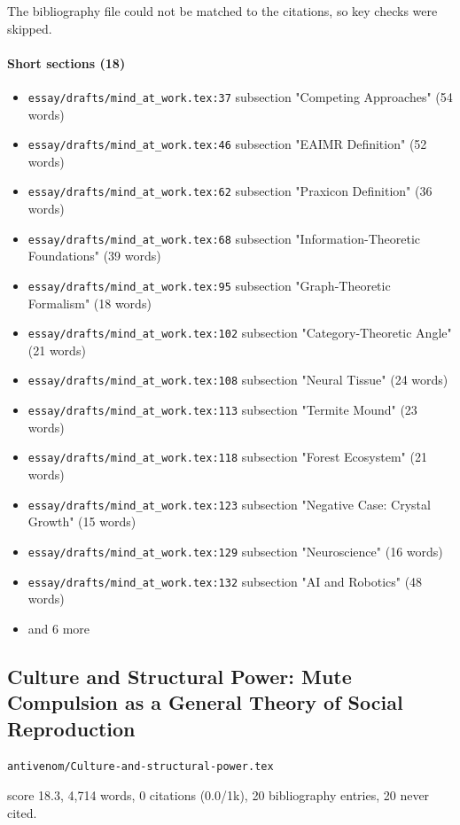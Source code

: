 \documentclass[11pt]{article}
\newcommand{\loc}[1]{{\small\color{muted}\texttt{#1}}}
\begin{document}
The bibliography file could not be matched to the citations, so key checks were skipped.

\paragraph{Short sections (18)}
\begin{itemize}
\item \loc{essay/\allowbreak{}drafts/\allowbreak{}mind\_at\_work.tex:37} subsection "Competing Approaches" (54 words)
\item \loc{essay/\allowbreak{}drafts/\allowbreak{}mind\_at\_work.tex:46} subsection "EAIMR Definition" (52 words)
\item \loc{essay/\allowbreak{}drafts/\allowbreak{}mind\_at\_work.tex:62} subsection "Praxicon Definition" (36 words)
\item \loc{essay/\allowbreak{}drafts/\allowbreak{}mind\_at\_work.tex:68} subsection "Information-Theoretic Foundations" (39 words)
\item \loc{essay/\allowbreak{}drafts/\allowbreak{}mind\_at\_work.tex:95} subsection "Graph-Theoretic Formalism" (18 words)
\item \loc{essay/\allowbreak{}drafts/\allowbreak{}mind\_at\_work.tex:102} subsection "Category-Theoretic Angle" (21 words)
\item \loc{essay/\allowbreak{}drafts/\allowbreak{}mind\_at\_work.tex:108} subsection "Neural Tissue" (24 words)
\item \loc{essay/\allowbreak{}drafts/\allowbreak{}mind\_at\_work.tex:113} subsection "Termite Mound" (23 words)
\item \loc{essay/\allowbreak{}drafts/\allowbreak{}mind\_at\_work.tex:118} subsection "Forest Ecosystem" (21 words)
\item \loc{essay/\allowbreak{}drafts/\allowbreak{}mind\_at\_work.tex:123} subsection "Negative Case: Crystal Growth" (15 words)
\item \loc{essay/\allowbreak{}drafts/\allowbreak{}mind\_at\_work.tex:129} subsection "Neuroscience" (16 words)
\item \loc{essay/\allowbreak{}drafts/\allowbreak{}mind\_at\_work.tex:132} subsection "AI and Robotics" (48 words)
\item[] {\color{muted}\small and 6 more}
\end{itemize}
\subsection{Culture and Structural Power: Mute Compulsion as a General Theory of Social Reproduction}
\loc{antivenom/\allowbreak{}Culture-and-structural-power.tex}\par
score 18.3, 4,714 words, 0 citations (0.0/1k), 20 bibliography entries, 20 never cited.
\end{document}
